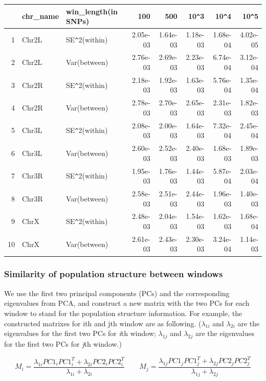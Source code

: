 \documentclass[11pt, oneside]{article}   	%
\begin{document}
\begin{table}[ht]
\centering
\begin{tabular}{rllrrrrr}
  \hline
 & chr\_name & win\_length(in SNPs) & 100 & 500 & 10\verb|^|3 & 10\verb|^|4 & 10\verb|^|5 \\ 
  \hline
1 & Chr2L & SE\verb|^|2(within) & 2.05e-03 & 1.64e-03 & 1.18e-03 & 1.68e-04 & 4.02e-05 \\ 
  2 & Chr2L & Var(between) & 2.76e-03 & 2.69e-03 & 2.23e-03 & 6.74e-04 & 3.12e-04 \\ 
  3 & Chr2R & SE\verb|^|2(within) & 2.18e-03 & 1.92e-03 & 1.63e-03 & 5.76e-04 & 1.35e-04 \\ 
  4 & Chr2R & Var(between) & 2.78e-03 & 2.70e-03 & 2.65e-03 & 2.31e-03 & 1.82e-03 \\ 
  5 & Chr3L & SE\verb|^|2(within) & 2.08e-03 & 2.00e-03 & 1.64e-03 & 7.32e-04 & 2.45e-04 \\ 
  6 & Chr3L & Var(between) & 2.60e-03 & 2.52e-03 & 2.40e-03 & 1.68e-03 & 1.89e-03 \\ 
  7 & Chr3R & SE\verb|^|2(within) & 1.95e-03 & 1.76e-03 & 1.44e-03 & 5.87e-04 & 2.03e-04 \\ 
  8 & Chr3R & Var(between) & 2.58e-03 & 2.51e-03 & 2.44e-03 & 1.96e-03 & 1.40e-03 \\ 
  9 & ChrX & SE\verb|^|2(within) & 2.48e-03 & 2.04e-03 & 1.54e-03 & 1.62e-03 & 1.68e-04 \\ 
  10 & ChrX & Var(between) & 2.61e-03 & 2.43e-03 & 2.30e-03 & 3.24e-04 & 1.14e-03 \\ 
   \hline
\end{tabular}
\end{table}

\subsubsection{Similarity of population structure between windows}
We use the first two principal components (PCs) and the corresponding eigenvalues from PCA, and construct a new matrix with the two PCs for each window to stand for the population structure information. For example, the constructed matrixes for ith and jth window are as following. ($\lambda _{1i}$ and $\lambda _{2i}$ are the eigenvalues for the first two PCs for \textit{i}th window; $\lambda _{1j}$ and $\lambda _{2j}$ are the eigenvalues for the first two PCs for \textit{j}th window.)

\begin{equation}
M_{i}=\frac{\lambda _{1i}PC1_{i}PC1_{i}^{T}+\lambda _{2i}PC2_{i}PC2_{i}^{T}}{\lambda _{1i}+\lambda _{2i}} \qquad
M_{j}=\frac{\lambda _{1j}PC1_{j}PC1_{j}^{T}+\lambda _{2j}PC2_{j}PC2_{j}^{T}}{\lambda _{1j}+\lambda _{2j}}
\end{equation}
\end{document}
